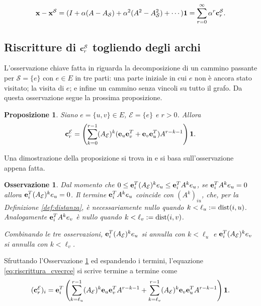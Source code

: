 \documentclass[a4paper]{article}
\newcommand{\dist}{{\rm dist}}
\newcommand{\evec}{{\bf e}}
\newcommand{\cvec}{{\bf c}}
\newcommand{\xvec}{{\bf x}}
\newcommand{\bone}{\mathbf{1}}
\newcommand{\cS}{\mathcal{S}}
\newcommand{\cE}{\mathcal{E}}
\newtheorem{remark}{Osservazione}
\newtheorem{proposition}{Proposizione}
\begin{document}
\begin{equation} \label{eq:scrittura_del_cambio_di_centralità}
	\xvec - \xvec^\cS = (I + \alpha (A - A_\cS) + \alpha^2(A^2 - A_\cS^2)+ \cdots) \bone = \sum_{r=0}^\infty \alpha^r \cvec^\cS_r.
\end{equation}

\subsection{Riscritture di \texorpdfstring{$\cvec^\cS_r$}{cˢᵣ} togliendo degli archi}

L'osservazione chiave fatta in \cite{katz2024} riguarda la decomposizione di
un cammino passante per $\cS = \{e\}$ con $e \in E$ in tre parti: una parte
iniziale in cui $e$ non è ancora stato visitato; la visita di $e$; e infine
un cammino senza vincoli su tutto il grafo. Da questa osservazione
segue la prossima proposizione.

\begin{proposition}
	Siano $e = \{u, v\} \in E$, $\cE = \{e\}$ e $r > 0$. Allora
	\begin{equation} \label{eq:riscrittura_cvecrce}
		\cvec_r^\cE = \left( \sum_{k = 0}^{r-1} (A_\cE)^k (\evec_u\evec_v^T+\evec_v\evec_u^T)A^{r-k-1} \right) \bone.
	\end{equation}
\end{proposition}

Una dimostrazione della proposizione si trova in \cite[Proposition 1]{katz2024} e si basa sull'osservazione appena fatta.

\begin{remark} \label{remark:riscrittura_crei}
	Dal momento che $0 \leq \evec_i^T (A_\cE)^k e_u \leq \evec_i^T A^k e_u$,
	se $\evec_i^T A^k e_u = 0$ allora $\evec_i^T (A_\cE)^k e_u = 0$.
	Il termine $\evec_i^T A^k e_u$ coincide con $(A^k)_{iu}$, che,
	per la Definizione \ref{def:distanza}, è necessariamente nullo
	quando $k < \ell_u := \dist(i, u)$. Analogamente $\evec_i^T A^k e_v$
	è nullo quando $k < \ell_v := \dist(i, v)$.
	
	Combinando le tre osservazioni, $\evec_i^T (A_\cE)^k e_u$ si annulla
	con $k < \ell_u$ e $\evec_i^T (A_\cE)^k e_v$ si annulla con $k < \ell_v$.
\end{remark}

Sfruttando l'Osservazione \ref{remark:riscrittura_crei} ed espandendo i termini, l'equazione \eqref{eq:riscrittura_cvecrce} si scrive termine
a termine come
\begin{equation}
	(\cvec_r^\cE)_i = \evec_i^T \left( \sum_{k = \ell_u}^{r-1} (A_\cE)^k\evec_u\evec_v^TA^{r-k-1} + \sum_{k = \ell_v}^{r-1} (A_\cE)^k\evec_v\evec_u^TA^{r-k-1} \right) \bone.
\end{equation}
\end{document}
